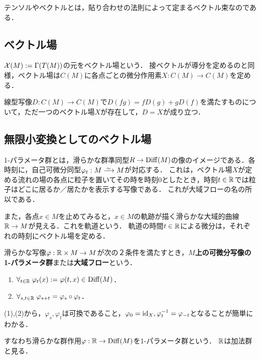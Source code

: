 \documentclass[uplatex,dvipdfmx]{jsreport}
\begin{document}
テンソルやベクトルとは，貼り合わせの法則によって定まるベクトル束なのである．

\subsection{ベクトル場}

\begin{definition}
    $\mathcal{X}(M):=\Gamma(T(M))$の元をベクトル場という．
    接ベクトルが導分を定めるのと同様，ベクトル場は$C(M)$に各点ごとの微分作用素$X:C(M)\to C(M)$を定める．
\end{definition}

\begin{theorem}
    線型写像$D:C(M)\to C(M)$で$D(fg)=fD(g)+gD(f)$を満たすものについて，ただ一つのベクトル場$X$が存在して，$D=X$が成り立つ．
\end{theorem}

\subsection{無限小変換としてのベクトル場}

\begin{tcolorbox}[colframe=ForestGreen, colback=ForestGreen!10!white,breakable,colbacktitle=ForestGreen!40!white,coltitle=black,fonttitle=\bfseries\sffamily,
title=ベクトル場を通じて多様体の形を考えたい]
    1-パラメータ群とは，滑らかな群準同型$R\to\mathrm{Diff}(M)$の像のイメージである．各時刻に，自己可微分同型$\varphi_t:M\iso M$が対応する．
    これは，ベクトル場$X$が定める流れの場の各点に粒子を置いてその時を時刻$0$としたとき，時刻$t\in\mathbb{R}$では粒子はどこに居るか／居たかを表示する写像である．
    これが大域フローの名の所以である．

    また，各点$x\in M$を止めてみると，$x\in M$の軌跡が描く滑らかな大域的曲線$\mathbb{R}\to M$が見える．これを軌道という．
    軌道の時間$t\in\mathbb{R}$による微分は，それぞれの時刻にベクトル場を定める．
\end{tcolorbox}

\begin{definition}
    滑らかな写像$\varphi:\mathbb{R}\times M\to M$が次の２条件を満たすとき，\textbf{$M$上の可微分写像の1-パラメータ群}または\textbf{大域フロー}という．
    \begin{enumerate}
        \item $\forall_{t\in\mathbb{R}}\;\varphi_t(x):=\varphi(t,x)\in\mathrm{Diff}(M)$．
        \item $\forall_{s,t\in\mathbb{R}}\;\varphi_{s+t}=\varphi_s\circ\varphi_t$．
    \end{enumerate}
    (1),(2)から，$\varphi_s,\varphi_t$は可換であること，$\varphi_0=\mathrm{id}_X,\varphi_t^{-1}=\varphi_{-t}$となることが簡単にわかる．
\end{definition}
\begin{remarks}
    すなわち滑らかな群作用$\varphi:\mathbb{R}\to\mathrm{Diff}(M)$を1-パラメータ群という．
    $\mathbb{R}$は加法群と見る．
\end{remarks}
\end{document}
